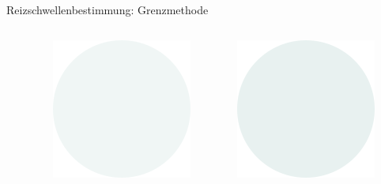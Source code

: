 \documentclass[aspectratio=169]{beamer}
\begin{document}
\begin{frame}{Reizschwellenbestimmung: Grenzmethode}
\begin{columns}[c]
\begin{column}{1cm}
\end{column}
\begin{column}{1cm}
\includegraphics[width=\textwidth]{reizschwelle_seriell_3.png}
\end{column}
\begin{column}{1cm}
\includegraphics[width=\textwidth]{reizschwelle_seriell_4.png}

\end{column}
\end{columns}
\end{frame}
\end{document}
